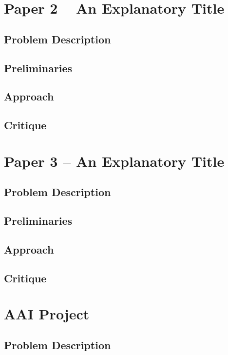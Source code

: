 \documentclass[12pt]{article}
\begin{document}
\section{Paper 2 -- An Explanatory Title}
\subsection{Problem Description}

\subsection{Preliminaries}

\subsection{Approach}

\subsection{Critique}




\section{Paper 3 -- An Explanatory Title}
\subsection{Problem Description}

\subsection{Preliminaries}

\subsection{Approach}

\subsection{Critique}

\section{AAI Project}
\subsection{Problem Description}
\end{document}
